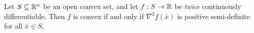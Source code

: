 
\begin{cor}
    Let $S \subseteq \mathbb{R}^n$ be an open convex set, and let $f: S \to \mathbb{R}$ be \emph{twice} continuously differentiable. Then $f$ is convex if and only if $\nabla^2f(\bar{x})$ is positive semi-definite for all $\bar{x} \in S$.
\end{cor}

